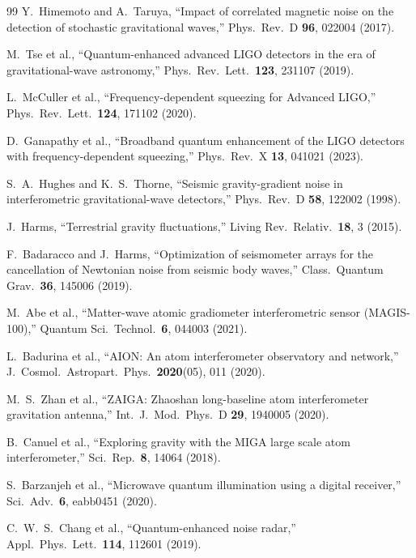 \documentclass[aps,prl,twocolumn,superscriptaddress,showpacs]{revtex4-2}
\theoremstyle{definition}
\begin{document}
\begin{thebibliography}{99}
Y.~Himemoto and A.~Taruya,
``Impact of correlated magnetic noise on the detection of stochastic
gravitational waves,''
Phys.\ Rev.\ D \textbf{96}, 022004 (2017).

M.~Tse et al.,
``Quantum-enhanced advanced LIGO detectors in the era of gravitational-wave
astronomy,''
Phys.\ Rev.\ Lett.\ \textbf{123}, 231107 (2019).

L.~McCuller et al.,
``Frequency-dependent squeezing for Advanced LIGO,''
Phys.\ Rev.\ Lett.\ \textbf{124}, 171102 (2020).

D.~Ganapathy et al.,
``Broadband quantum enhancement of the LIGO detectors with
frequency-dependent squeezing,''
Phys.\ Rev.\ X \textbf{13}, 041021 (2023).

S.~A.~Hughes and K.~S.~Thorne,
``Seismic gravity-gradient noise in interferometric gravitational-wave
detectors,''
Phys.\ Rev.\ D \textbf{58}, 122002 (1998).

J.~Harms,
``Terrestrial gravity fluctuations,''
Living Rev.\ Relativ.\ \textbf{18}, 3 (2015).

F.~Badaracco and J.~Harms,
``Optimization of seismometer arrays for the cancellation of Newtonian
noise from seismic body waves,''
Class.\ Quantum Grav.\ \textbf{36}, 145006 (2019).

M.~Abe et al.,
``Matter-wave atomic gradiometer interferometric sensor (MAGIS-100),''
Quantum Sci.\ Technol.\ \textbf{6}, 044003 (2021).

L.~Badurina et al.,
``AION: An atom interferometer observatory and network,''
J.\ Cosmol.\ Astropart.\ Phys.\ \textbf{2020}(05), 011 (2020).

M.~S.~Zhan et al.,
``ZAIGA: Zhaoshan long-baseline atom interferometer gravitation antenna,''
Int.\ J.\ Mod.\ Phys.\ D \textbf{29}, 1940005 (2020).

B.~Canuel et al.,
``Exploring gravity with the MIGA large scale atom interferometer,''
Sci.\ Rep.\ \textbf{8}, 14064 (2018).

S.~Barzanjeh et al.,
``Microwave quantum illumination using a digital receiver,''
Sci.\ Adv.\ \textbf{6}, eabb0451 (2020).

C.~W.~S.~Chang et al.,
``Quantum-enhanced noise radar,''
Appl.\ Phys.\ Lett.\ \textbf{114}, 112601 (2019).


\end{thebibliography}
\end{document}
